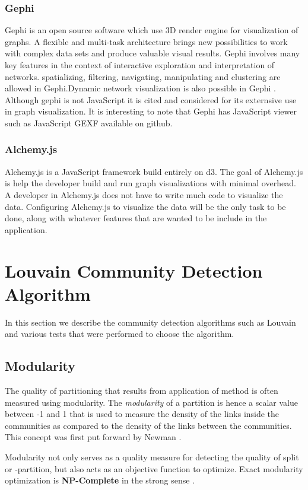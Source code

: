 \subsection{Gephi}

Gephi is an open source software which use 3D render engine for visualization of graphs. 
A flexible and multi-task architecture brings new possibilities
to work with complex data sets and produce
valuable visual results. 
Gephi involves many key features in the context of interactive exploration and
interpretation of networks.  spatializing, filtering,
navigating, manipulating and clustering are allowed in Gephi.Dynamic network visualization is also possible in Gephi \cite{gephi}.
Although gephi is not JavaScript it is cited and considered for its externsive use in graph visualization. It is interesting to note that Gephi has JavaScript viewer such as JavaScript GEXF available on github. 

\subsection{Alchemy.js}
Alchemy.js is a JavaScript framework build entirely on d3. The goal of Alchemy.js is help the developer build and run graph visualizations with minimal overhead. A developer in Alchemy.js does not have to write much code to visualize the data. Configuring Alchemy.js to visualize the data will be the only task to be done, along with whatever features that are wanted to be include in the application.

\chapter{Louvain Community Detection Algorithm}
In this section we describe the community detection algorithms such as Louvain and various tests that were performed to choose the algorithm. 
 
\section{Modularity}
The quality of partitioning that results from application of method is often measured using modularity. The \textit{modularity} of a partition is hence a scalar value between -1 and 1 that is used to measure the density of the links inside the communities as compared to the density of the links between the communities. This concept was first put forward by Newman \cite{newman2006modularity}.
\par
Modularity not only serves as a quality measure for detecting the quality of split or -partition, but also acts as an objective function to optimize.  Exact modularity optimization is \textbf{NP-Complete} in the strong sense \cite{modularityNP}.
